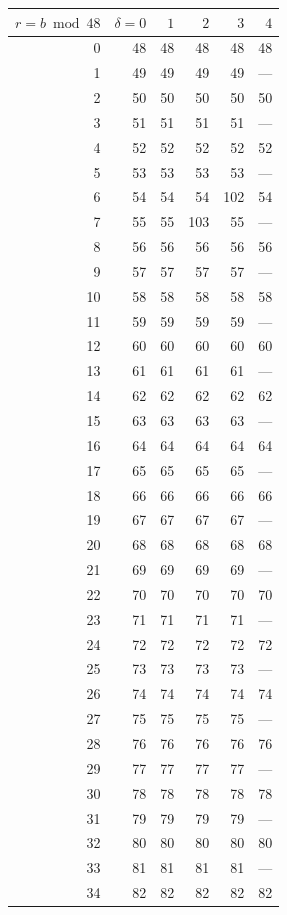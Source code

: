 \begin{longtable}{r|rrrrr}
$r=b\bmod48$ & $\delta=0$ & $1$ & $2$ & $3$ & $4$\\\hline\endhead
0 & 48 & 48 & 48 & 48 & 48\\
1 & 49 & 49 & 49 & 49 & ---\\
2 & 50 & 50 & 50 & 50 & 50\\
3 & 51 & 51 & 51 & 51 & ---\\
4 & 52 & 52 & 52 & 52 & 52\\
5 & 53 & 53 & 53 & 53 & ---\\
6 & 54 & 54 & 54 & 102 & 54\\
7 & 55 & 55 & 103 & 55 & ---\\
8 & 56 & 56 & 56 & 56 & 56\\
9 & 57 & 57 & 57 & 57 & ---\\
10 & 58 & 58 & 58 & 58 & 58\\
11 & 59 & 59 & 59 & 59 & ---\\
12 & 60 & 60 & 60 & 60 & 60\\
13 & 61 & 61 & 61 & 61 & ---\\
14 & 62 & 62 & 62 & 62 & 62\\
15 & 63 & 63 & 63 & 63 & ---\\
16 & 64 & 64 & 64 & 64 & 64\\
17 & 65 & 65 & 65 & 65 & ---\\
18 & 66 & 66 & 66 & 66 & 66\\
19 & 67 & 67 & 67 & 67 & ---\\
20 & 68 & 68 & 68 & 68 & 68\\
21 & 69 & 69 & 69 & 69 & ---\\
22 & 70 & 70 & 70 & 70 & 70\\
23 & 71 & 71 & 71 & 71 & ---\\
24 & 72 & 72 & 72 & 72 & 72\\
25 & 73 & 73 & 73 & 73 & ---\\
26 & 74 & 74 & 74 & 74 & 74\\
27 & 75 & 75 & 75 & 75 & ---\\
28 & 76 & 76 & 76 & 76 & 76\\
29 & 77 & 77 & 77 & 77 & ---\\
30 & 78 & 78 & 78 & 78 & 78\\
31 & 79 & 79 & 79 & 79 & ---\\
32 & 80 & 80 & 80 & 80 & 80\\
33 & 81 & 81 & 81 & 81 & ---\\
34 & 82 & 82 & 82 & 82 & 82\\

\end{longtable}
